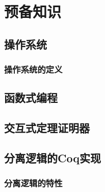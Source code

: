 \chapter{预备知识}
\section{操作系统}
\subsection{操作系统的定义}
\section{函数式编程}
\section{交互式定理证明器}
\section{分离逻辑的Coq实现}
\subsection{分离逻辑的特性}